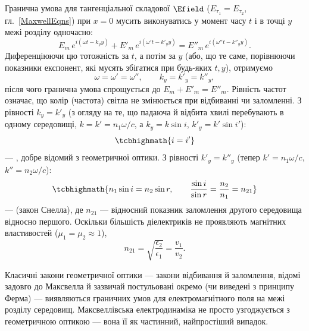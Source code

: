Гранична умова для тангенціальної складової $\Efield$ ($E_{\tau_1}=E_{\tau_2}$, гл.~\ref{MaxwellEqns}) при $x=0$ мусить виконуватись у
 момент часу $t$ і в  точці $y$ межі розділу одночасно:
\begin{equation*}
	E_m\, e^{i(\omega t-k_yy)} + E'_m\, e^{i(\omega' t-k'_yy)} = E''_m\, e^{i(\omega'' t-k''_yy)}.
\end{equation*}
Диференціюючи цю тотожність за $t$, а потім за $y$ (або, що те саме, порівнюючи показники експонент, які мусять збігатися при будь-яких $t,y$),
отримуємо
\begin{equation}\label{eq:BoundaryConditionE}
	\omega = \omega' = \omega'', \qquad k_y = k'_y = k''_y,
\end{equation}
після чого гранична умова спрощується до $E_m + E'_m = E''_m$. Рівність частот означає, що колір (частота) світла не змінюється при відбиванні
чи заломленні. З рівності $k_y = k'_y$ (з огляду на те, що падаюча й відбита хвилі перебувають в одному середовищі, $k=k'=n_1\omega/c$, а
$k_y = k\sin i$, $k'_y=k'\sin i'$):
\begin{equation}\label{eq:SnellReflection}
	\tcbhighmath{
		i = i'
	}
\end{equation}
--- , добре відомий з геометричної оптики. З рівності $k'_y=k''_y$ (тепер $k'=n_1\omega/c$, $k''=n_2\omega/c$):
\begin{equation}\label{eq:SnellRefraction}
	\tcbhighmath{
		n_1\sin i = n_2\sin r, \qquad \frac{\sin i}{\sin r} = \frac{n_2}{n_1} = n_{21}
	}
\end{equation}
---  (закон Снелла), де $n_{21}$ --- відносний показник заломлення другого середовища відносно першого. Оскільки
більшість діелектриків не проявляють магнітних властивостей ($\mu_1=\mu_2\approx1$),
\begin{equation}\label{eq:RelativeIndex}
	n_{21} = \sqrt{\frac{\epsilon_2}{\epsilon_1}} = \frac{v_1}{v_2}.
\end{equation}

\begin{Attention}
	Класичні закони геометричної оптики --- закони відбивання й заломлення, відомі задовго до Максвелла й зазвичай постульовані окремо (чи
	виведені з принципу Ферма) --- виявляються  граничних умов для електромагнітного поля на межі розділу середовищ.
	Максвеллівська електродинаміка не просто узгоджується з геометричною оптикою --- вона  її як частинний, найпростіший випадок.
\end{Attention}

